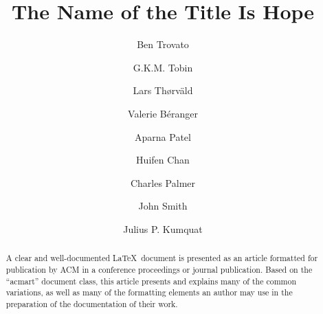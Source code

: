 \documentclass[acmsmall]{acmart}
\begin{document}
	
	\title{The Name of the Title Is Hope}
	
	\author{Ben Trovato}
	\author{G.K.M. Tobin}
	\authornotemark[1]
	
	\author{Lars Th{\o}rv{\"a}ld}
	
	\author{Valerie B\'eranger}
	
	\author{Aparna Patel}
	
	\author{Huifen Chan}
	
	\author{Charles Palmer}
	
	\author{John Smith}
	
	\author{Julius P. Kumquat}
	
	\renewcommand{\shortauthors}{Trovato et al.}
	
	\begin{abstract}
		A clear and well-documented \LaTeX\ document is presented as an
		article formatted for publication by ACM in a conference proceedings
		or journal publication. Based on the ``acmart'' document class, this
		article presents and explains many of the common variations, as well
		as many of the formatting elements an author may use in the
		preparation of the documentation of their work.
	\end{abstract}
	
\end{document}
